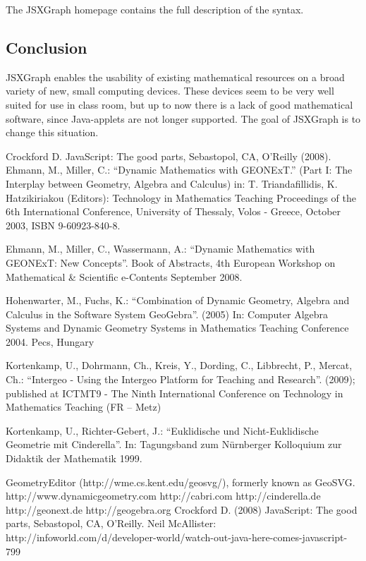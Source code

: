 \documentclass[12pt,a4paper]{article}%
\begin{document}
The JSXGraph homepage contains the full description of the syntax.

\subsection{Conclusion}
JSXGraph enables the usability of existing mathematical resources on a broad variety of new, small computing devices. These devices seem to be very well suited for use in class room, but up to now there is a lack of good mathematical software, since Java-applets are not longer supported. The goal of JSXGraph is to change this situation.

\begin{thebibliography}{99}
     Crockford D. JavaScript: The good parts, Sebastopol, CA, O'Reilly (2008).
     Ehmann, M., Miller, C.: ``Dynamic Mathematics with GEONExT.''
        (Part I: The Interplay between Geometry, Algebra and Calculus)
        in: T. Triandafillidis, K. Hatzikiriakou (Editors): Technology in Mathematics Teaching
        Proceedings of the 6th International Conference, University of Thessaly, Volos - Greece, October 2003, ISBN 9-60923-840-8.    
 
     Ehmann, M., Miller, C., Wassermann, A.: ``Dynamic Mathematics with GEONExT: New Concepts''. Book of Abstracts, 4th European Workshop on Mathematical & Scientific e-Contents
    September 2008.   

     Hohenwarter, M., Fuchs, K.: ``Combination of Dynamic Geometry, Algebra and Calculus in the Software System GeoGebra''. (2005) In: Computer Algebra Systems and Dynamic Geometry Systems in Mathematics Teaching Conference 2004. Pecs, Hungary 

     Kortenkamp, U., Dohrmann, Ch., Kreis, Y., Dording, C., Libbrecht, P., Mercat, Ch.: ``Intergeo - Using the Intergeo Platform for Teaching and Research''. (2009); published at ICTMT9 - The Ninth International Conference on Technology in Mathematics Teaching (FR – Metz)

     Kortenkamp, U., Richter-Gebert, J.: ``Euklidische und Nicht-Euklidische Geometrie mit Cinderella''. In: Tagungsband zum N\"{u}rnberger Kolloquium zur Didaktik der Mathematik 1999.


     GeometryEditor (http://wme.cs.kent.edu/geosvg/), formerly known as GeoSVG.
     http://www.dynamicgeometry.com
     http://cabri.com 
     http://cinderella.de 
     http://geonext.de 
     http://geogebra.org
     Crockford D. (2008) JavaScript: The good parts, Sebastopol, CA, O'Reilly.
     Neil McAllister: http://infoworld.com/d/developer-world/watch-out-java-here-comes-javascript-799
\end{thebibliography}
\end{document}
